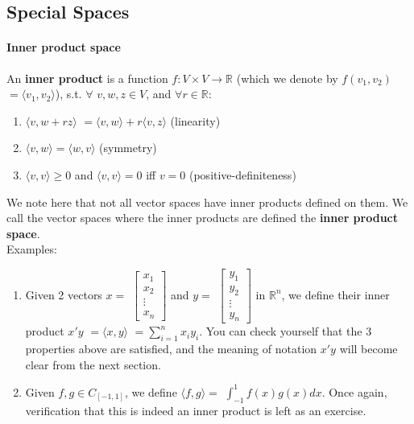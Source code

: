 \documentclass[12pt,oneside]{article}
\begin{document}
\subsection{Special Spaces}
\paragraph{Inner product space}
An \textbf{inner product} is a function $f: V \times V \rightarrow \mathbb{R}$
(which we denote by $f(v_{1}, v_{2})$ $= \langle v_{1}, v_{2} \rangle$),
s.t. $\forall$ $v, w, z \in V$, and $\forall r \in \mathbb{R}$:
\begin{enumerate}
\item $\langle v, w + r z \rangle$ $= \langle v, w \rangle + r \langle v, z \rangle$ (linearity)
\item $\langle v, w \rangle = \langle w, v \rangle$ (symmetry)
\item $\langle v, v \rangle \geq 0$ and $\langle v, v \rangle = 0$ iff $v = 0$ (positive-definiteness)
\end{enumerate}
We note here that not all vector spaces have inner products defined on
them.
We call the vector spaces where the inner products are defined the \textbf{inner product space}.\\

\noindent Examples:
\begin{enumerate}
\item Given 2 vectors $x =$ $\left[ \begin{array} {c} x_{1} \\ x_{2} \\
      \vdots \\ x_{n} \end{array} \right]$ and $y =$ $\left[
      \begin{array} {c} y_{1} \\ y_{2} \\ \vdots \\ y_{n} \end{array}
      \right]$ in ${\mathbb{R}}^{n}$, we define their inner product
      $x'y$ $= \langle x, y \rangle$ $= \displaystyle\sum_{i=1}^{n} {x_{i}
      y_{i}}$. You can check yourself that the 3 properties above are
      satisfied, and the meaning of notation $x' y$ will become clear
      from the next section.
\item Given $f, g \in C_{[-1, 1]}$, we define $\langle f, g \rangle =$ $\int_{-1}^{1}
  {f(x) g(x) dx}$. Once again, verification that this is indeed an
  inner product is left as an exercise.
\end{enumerate}
\end{document}
